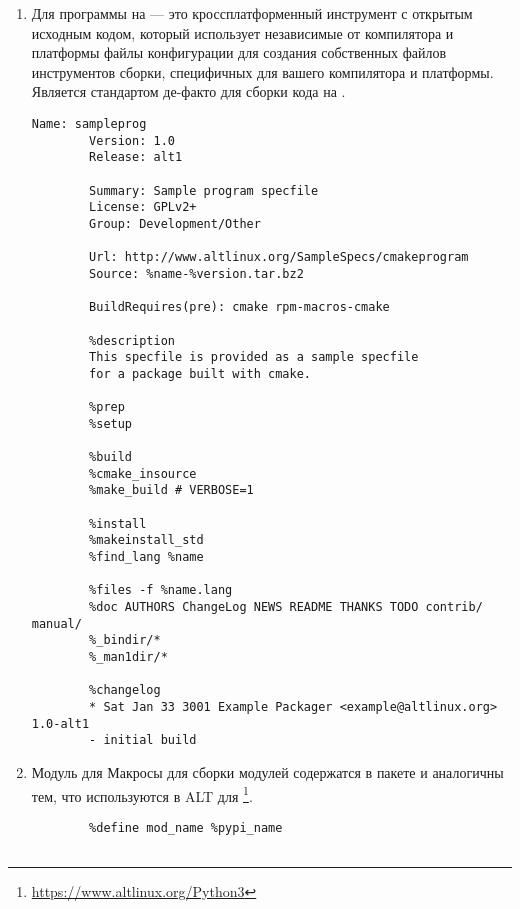 \begin{enumerate}
\begin{Verbatim}[breaklines=true,breakanywhere=true,xleftmargin=-2.95cm]
		%description
		This specfile is provided as sample specfile for packages with programs.
		It contains most of usual tags and constructions used in such specfiles.
		
		%description -l ru_RU.UTF-8
		
		%prep
		%setup
		%patch0 -p1
		
		%build
		%configure
		%make_build
		
		%install
		%makeinstall_std
		%find_lang %name
		
		%files -f %name.lang
		%doc AUTHORS ChangeLog NEWS README THANKS TODO contrib/ manual/
		%_bindir/*
		%_man1dir/*
		
		%changelog
		* Sat Sep 33 3001 Sample Packager <sample@altlinux.org> 1.0-alt1
		- initial build
	\end{Verbatim}
	
	\item Для программы на 
	 --- это кроссплатформенный инструмент с открытым исходным кодом, который использует независимые от компилятора и платформы файлы конфигурации для создания собственных файлов инструментов сборки, специфичных для вашего компилятора и платформы. Является стандартом де-факто для сборки кода на .
	\begin{Verbatim}[breaklines=true,breakanywhere=true,xleftmargin=-2.95cm]
		Name: sampleprog
		Version: 1.0
		Release: alt1
		
		Summary: Sample program specfile
		License: GPLv2+
		Group: Development/Other
		
		Url: http://www.altlinux.org/SampleSpecs/cmakeprogram
		Source: %name-%version.tar.bz2
		
		BuildRequires(pre): cmake rpm-macros-cmake
		
		%description
		This specfile is provided as a sample specfile
		for a package built with cmake.
		
		%prep
		%setup
		
		%build
		%cmake_insource
		%make_build # VERBOSE=1
		
		%install
		%makeinstall_std
		%find_lang %name
		
		%files -f %name.lang
		%doc AUTHORS ChangeLog NEWS README THANKS TODO contrib/ manual/
		%_bindir/*
		%_man1dir/*
		
		%changelog
		* Sat Jan 33 3001 Example Packager <example@altlinux.org> 1.0-alt1
		- initial build
	\end{Verbatim}
	
	\item Модуль для 
	Макросы для сборки модулей  содержатся в пакете  и аналогичны тем, что используются в ALT для \footnote{\href{https://www.altlinux.org/Python3}{https://www.altlinux.org/Python3}}.
	\begin{Verbatim}[breaklines=true,breakanywhere=true,xleftmargin=-2.95cm]
		%define pypi_name @NAME@
		%define mod_name %pypi_name
		

\end{Verbatim}
\end{enumerate}
